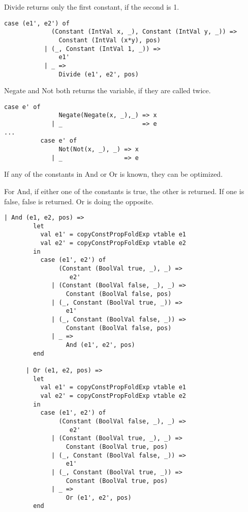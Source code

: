 \documentclass[10pt]{article}
\begin{document}
Divide returns only the first constant, if the second is 1.
\begin{Verbatim}[frame=single]
        case (e1', e2') of
             (Constant (IntVal x, _), Constant (IntVal y, _)) =>
               Constant (IntVal (x*y), pos)
           | (_, Constant (IntVal 1, _)) =>
               e1'
           | _ =>
               Divide (e1', e2', pos)
\end{Verbatim}

Negate and Not both returns the variable, if they are called twice.
\begin{Verbatim}[frame=single]
          case e' of
               Negate(Negate(x, _),_) => x
             | _                      => e
...
          case e' of
               Not(Not(x, _), _) => x
             | _                 => e
\end{Verbatim}

If any of the constants in And or Or is known, they can be optimized.

For And, if either one of the constants is true, the other is returned. If one is false, false is returned. Or is doing the opposite.
\begin{Verbatim}[frame=single]
      | And (e1, e2, pos) =>
        let 
          val e1' = copyConstPropFoldExp vtable e1
          val e2' = copyConstPropFoldExp vtable e2
        in 
          case (e1', e2') of
               (Constant (BoolVal true, _), _) =>
                  e2'
             | (Constant (BoolVal false, _), _) =>
                 Constant (BoolVal false, pos)
             | (_, Constant (BoolVal true, _)) =>
                 e1'
             | (_, Constant (BoolVal false, _)) =>
                 Constant (BoolVal false, pos)
             | _ =>
                 And (e1', e2', pos)
        end

      | Or (e1, e2, pos) =>
        let 
          val e1' = copyConstPropFoldExp vtable e1
          val e2' = copyConstPropFoldExp vtable e2
        in 
          case (e1', e2') of
               (Constant (BoolVal false, _), _) =>
                  e2'
             | (Constant (BoolVal true, _), _) =>
                 Constant (BoolVal true, pos)
             | (_, Constant (BoolVal false, _)) =>
                 e1'
             | (_, Constant (BoolVal true, _)) =>
                 Constant (BoolVal true, pos)
             | _ =>
                 Or (e1', e2', pos)
        end
\end{Verbatim}





















\begin{Verbatim}[frame=single]

\end{Verbatim}
\end{document}
